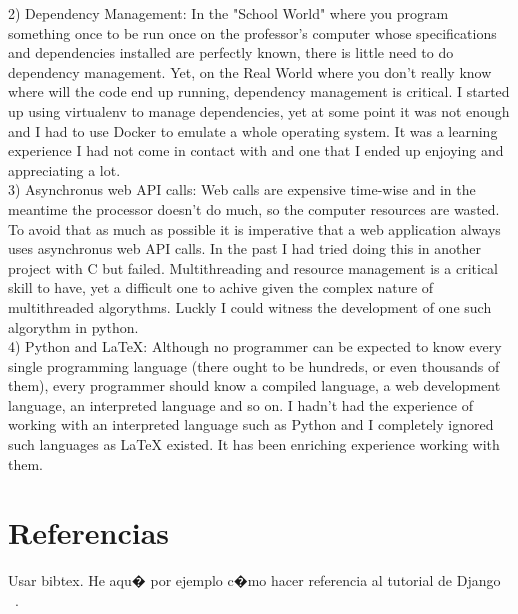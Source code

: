 \documentclass[10pt]{article}
\begin{document}
2) Dependency Management: In the "School World" where you program something once to be run once on the professor's computer whose specifications and dependencies installed are perfectly known, there is little need to do dependency management. Yet, on the Real World where you don't really know where will the code end up running, dependency management is critical. I started up using virtualenv to manage dependencies, yet at some point it was not enough and I had to use Docker to emulate a whole operating system. It was a learning experience I had not come in contact with and one that I ended up enjoying and appreciating a lot.\\

3) Asynchronus web API calls: Web calls are expensive time-wise and in the meantime the processor doesn't do much, so the computer resources are wasted. To avoid that as much as possible it is imperative that a web application always uses asynchronus web API calls. In the past I had tried doing this in another project with C but failed. Multithreading and resource management is a critical skill to have, yet a difficult one to achive given the complex nature of multithreaded algorythms. Luckly I could witness the development of one such algorythm in python.\\

4) Python and LaTeX: Although no programmer can be expected to know every single programming language (there ought to be hundreds, or even thousands of them), every programmer should know a compiled language, a web development language, an interpreted language and so on. I hadn't had the experience of working with an interpreted language such as Python and I completely ignored such languages as LaTeX existed. It has been enriching experience working with them.\\

\section{Referencias}
 Usar bibtex. He aqu� por ejemplo c�mo hacer referencia al tutorial de Django ~\cite{DjangoTut}.

{}

\end{document}
